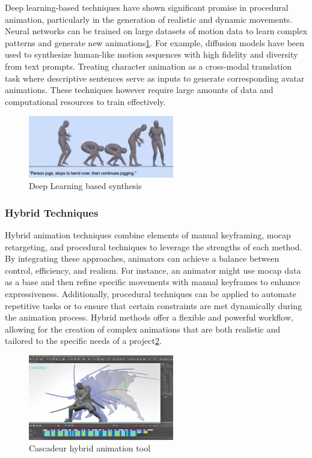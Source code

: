 \documentclass[../../main.tex]{subfiles}
\begin{document}
Deep learning-based techniques have shown significant promise in procedural animation, particularly in the generation of realistic and dynamic movements. Neural networks can be trained on large datasets of motion data to learn complex patterns and generate new animations\ref{fig:deep_learning_synthesis}. For example, diffusion models\cite{zhang2022motiondiffuse} have been used to synthesize human-like motion sequences with high fidelity and diversity from text prompts. Treating character animation as a cross-modal translation task where descriptive sentences serve as inputs to generate corresponding avatar animations. These techniques however require large amounts of data and computational resources to train effectively.

\begin{figure}
  \centering \includegraphics[width = 2.5in]{chapters/background_work/images/deep_learning_synthesis.png}
  \caption{Deep Learning based synthesis\cite{guo2022generating}}
  \label{fig:deep_learning_synthesis}
\end{figure}

\subsubsection{Hybrid Techniques}

Hybrid animation techniques combine elements of manual keyframing, mocap retargeting, and procedural techniques to leverage the strengths of each method. By integrating these approaches, animators can achieve a balance between control, efficiency, and realism. For instance, an animator might use mocap data as a base and then refine specific movements with manual keyframes to enhance expressiveness. Additionally, procedural techniques can be applied to automate repetitive tasks or to ensure that certain constraints are met dynamically during the animation process. Hybrid methods offer a flexible and powerful workflow, allowing for the creation of complex animations that are both realistic and tailored to the specific needs of a project\ref{fig:cascadeur}.

\begin{figure}
  \centering \includegraphics[width = 2.5in]{chapters/background_work/images/cascadeur.png}
  \caption{Cascadeur hybrid animation tool}
  \label{fig:cascadeur}
\end{figure}
\end{document}
